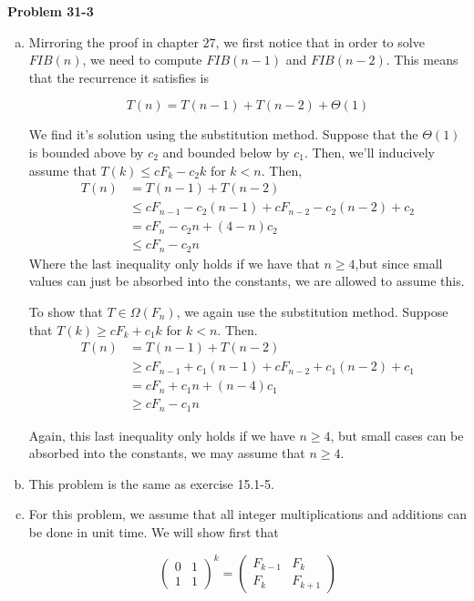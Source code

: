 \documentclass{article}
\begin{document}
\noindent\textbf{Problem 31-3}\\

\begin{enumerate}[a.]
\item
Mirroring the proof in chapter $27$, we first notice that in order to solve $FIB(n)$, we need to compute $FIB(n-1)$ and $FIB(n-2)$. This means that the recurrence it satisfies is

\[
T(n) = T(n-1) + T(n-2) + \Theta(1)
\]

We find it's solution using the substitution method. Suppose that the $\Theta(1)$ is bounded above by $c_2$ and bounded below by $c_1$. Then, we'll inducively assume that $T(k) \le cF_k - c_2k$ for $k<n$. Then,
\begin{align*}
T(n) &= T(n-1) + T(n-2) \\
&\le cF_{n-1} - c_2(n-1) + cF_{n-2} - c_2(n-2) + c_2\\
&= cF_n -c_2 n + (4 -n) c_2\\
&\le cF_n -c_2 n
\end{align*}
Where the last inequality only holds if we have that $n\ge 4$,but since small values can just be absorbed into the constants, we are allowed to assume this.

To show that $T\in \Omega(F_n)$, we again use the substitution method. Suppose that $T(k) \ge c F_k + c_1 k$ for $k<n$. Then.
\begin{align*}
T(n) &= T(n-1) + T(n-2) \\
&\ge cF_{n-1} + c_1(n-1) + cF_{n-2} + c_1(n-2) + c_1\\
&= cF_n +c_1 n + (n-4) c_1\\
&\ge cF_n -c_1 n
\end{align*}

Again, this last inequality only holds if we have $n\ge 4$, but small cases can be absorbed into the constants, we may assume that $n\ge 4$.

\item
This problem is the same as exercise 15.1-5.
\item
For this problem, we assume that all integer multiplications and additions can be done in unit time. We will show first that

\[
\left( \begin{array}{cc}0&1\\1&1\end{array}\right)^k = \left( \begin{array}{cc}F_{k-1}&F_{k}\\F_{k}&F_{k+1}\end{array}\right)
\]


\end{enumerate}
\end{document}
